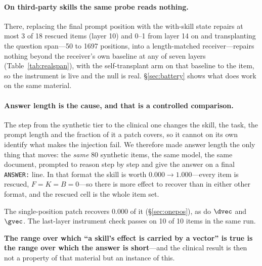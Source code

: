 \paragraph{On third-party skills the same probe reads nothing.} There,
replacing the final prompt position with the with-skill state repairs at most 3
of 18 rescued items (layer 10) and 0--1 from layer 14 on and transplanting the question span---50 to 1697 positions, into a
length-matched receiver---repairs nothing beyond the receiver's own baseline at
any of seven layers (Table~\ref{tab:realspan}), with the self-transplant arm on
that baseline to the item, so the instrument is live and the null is real.
\S\ref{sec:battery} shows what does work on the same material.

\paragraph{Answer length is the cause, and that is a controlled comparison.}
The step from the synthetic tier to the clinical one changes the skill, the
task, the prompt length and the fraction of it a patch covers, so it cannot on
its own identify what makes the injection fail. We therefore made answer length
the only thing that moves: the \emph{same} 80 synthetic items, the same model,
the same document, prompted to reason step by step and give the answer on a
final \texttt{ANSWER:} line. In that format the skill is worth $0.000 \to
1.000$---every item is rescued, $F=K=B=0$---so there is more effect to recover
than in either other format, and the rescued cell is the whole item set.

The single-position patch recovers $\mathbf{0.000}$ of it
(\S\ref{sec:onepos}), as do $\dvec$ and $\gvec$. The last-layer
instrument check passes on 10 of 10 items in the same run.





\textbf{The range over which ``a skill's effect is carried by a vector'' is true
is the range over which the answer is short}---and the clinical result is then
not a property of that material but an instance of this.

